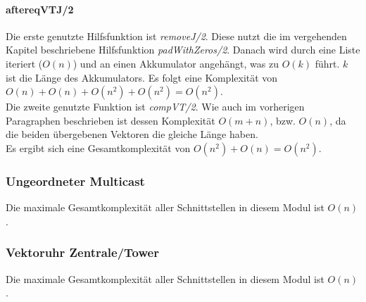 \paragraph{aftereqVTJ/2} \label{aftereqVTJ_complexity}

Die erste genutzte Hilfsfunktion ist \textit{removeJ/2}. Diese nutzt die im vergehenden Kapitel beschriebene Hilfsfunktion \textit{padWithZeros/2}. Danach wird durch eine Liste iteriert ($O(n)$) und an einen Akkumulator angehängt, was zu $O(k)$ führt. $k$ ist die Länge des Akkumulators. Es folgt eine Komplexität von $O(n)+O(n)+O(n^2)+O(n^2)=O(n^2)$.\\
Die zweite genutzte Funktion ist \textit{compVT/2}. Wie auch im vorherigen Paragraphen beschrieben ist dessen Komplexität $O(m+n)$, bzw. $O(n)$, da die beiden übergebenen Vektoren die gleiche Länge haben.\\
Es ergibt sich eine Gesamtkomplexität von $O(n^2)+O(n)=O(n^2).$

\subsubsection{Ungeordneter Multicast}

Die maximale Gesamtkomplexität aller Schnittstellen in diesem Modul ist $O(n)$.

\subsubsection{Vektoruhr Zentrale/Tower}

Die maximale Gesamtkomplexität aller Schnittstellen in diesem Modul ist $O(n)$.
